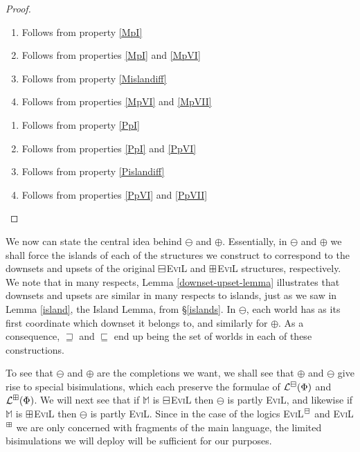 \begin{proof}\ \\
\begin{minipage}[b]{0.5\linewidth}
\begin{enumerate}[label=\textup{(\emph{\arabic*})$^\BM$},
  topsep=0.075in, parsep=0.075in]
  \item Follows from property \ref{MpI}
  \item Follows from properties \ref{MpI} and \ref{MpVI}
  \item Follows from property \ref{Mislandiff}
  \item Follows from properties \ref{MpVI} and \ref{MpVII}
\end{enumerate}
\end{minipage}
\hspace{0.5cm}
\begin{minipage}[b]{0.5\linewidth}
\begin{enumerate}[label=\textup{(\emph{\arabic*})$^\BP$},
  topsep=0.075in, parsep=0.075in]
 \item Follows from property \ref{PpI}
  \item Follows from properties \ref{PpI} and \ref{PpVI}
  \item Follows from property \ref{Pislandiff}
  \item Follows from properties \ref{PpVI} and \ref{PpVII}
\end{enumerate}
\end{minipage}
\end{proof}

We now can state the central idea behind $\ominus$ and $\oplus$.
Essentially, in $\ominus$ and $\oplus$  we shall force the
islands of each of the structures we construct to correspond to the downsets and
upsets of the original $\boxminus$\textsc{EviL} and $\boxplus$\textsc{EviL}
structures, respectively.  We note that in many respects, Lemma
\ref{downset-upset-lemma} illustrates that downsets and upsets are
similar in many respects to islands, just as we saw in Lemma
\ref{island}, the Island Lemma, from \S\ref{islands}. In $\ominus$, each world has as its first coordinate which downset it
belongs to, and similarly for $\oplus$.  As a consequence,
$\sqsupseteq$ and $\sqsubseteq$ end up being the set of worlds in each
of these constructions.

To see that $\ominus$ and $\oplus$ are the completions we want, we shall see that $\oplus$ and $\ominus$ give rise to special
bisimulations, which each preserve the formulae of
$\mathcal{L}^\boxminus(\Phi)$ and $\mathcal{L}^\boxplus(\Phi)$.  We will next
see that if $\mathbb{M}$ is $\boxminus$\textsc{EviL} then $\ominus$ is
partly \textsc{EviL}, and likewise if $\mathbb{M}$ is
$\boxplus$\textsc{EviL} then $\ominus$  is partly \textsc{EviL}.  Since in
the case of the logics \textsc{EviL}$^\BM$ and \textsc{EviL}$^\BP$ we
are only concerned with fragments of the main language, the limited
bisimulations we will deploy will be sufficient for our purposes.


